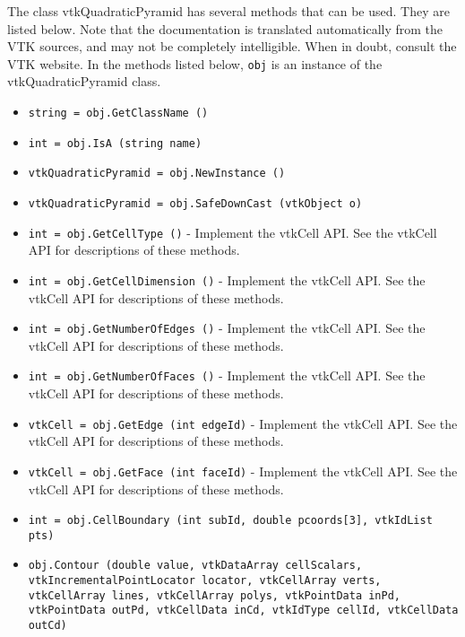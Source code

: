 The class vtkQuadraticPyramid has several methods that can be used.
  They are listed below.
Note that the documentation is translated automatically from the VTK sources,
and may not be completely intelligible.  When in doubt, consult the VTK website.
In the methods listed below, \verb|obj| is an instance of the vtkQuadraticPyramid class.
\begin{itemize}
\item  \verb|string = obj.GetClassName ()|

\item  \verb|int = obj.IsA (string name)|

\item  \verb|vtkQuadraticPyramid = obj.NewInstance ()|

\item  \verb|vtkQuadraticPyramid = obj.SafeDownCast (vtkObject o)|

\item  \verb|int = obj.GetCellType ()| -  Implement the vtkCell API. See the vtkCell API for descriptions
 of these methods.

\item  \verb|int = obj.GetCellDimension ()| -  Implement the vtkCell API. See the vtkCell API for descriptions
 of these methods.

\item  \verb|int = obj.GetNumberOfEdges ()| -  Implement the vtkCell API. See the vtkCell API for descriptions
 of these methods.

\item  \verb|int = obj.GetNumberOfFaces ()| -  Implement the vtkCell API. See the vtkCell API for descriptions
 of these methods.

\item  \verb|vtkCell = obj.GetEdge (int edgeId)| -  Implement the vtkCell API. See the vtkCell API for descriptions
 of these methods.

\item  \verb|vtkCell = obj.GetFace (int faceId)| -  Implement the vtkCell API. See the vtkCell API for descriptions
 of these methods.

\item  \verb|int = obj.CellBoundary (int subId, double pcoords[3], vtkIdList pts)|

\item  \verb|obj.Contour (double value, vtkDataArray cellScalars, vtkIncrementalPointLocator locator, vtkCellArray verts, vtkCellArray lines, vtkCellArray polys, vtkPointData inPd, vtkPointData outPd, vtkCellData inCd, vtkIdType cellId, vtkCellData outCd)|


\end{itemize}

